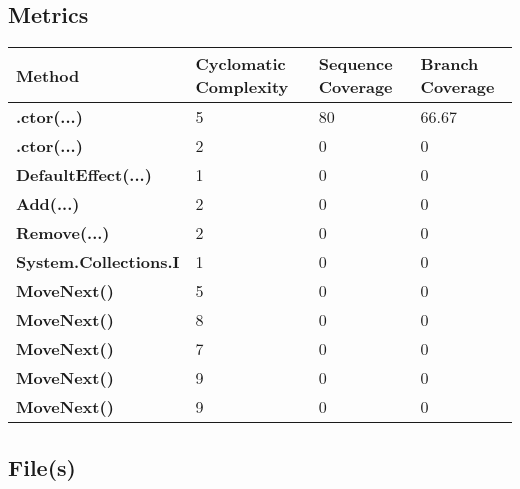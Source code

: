 \documentclass[a4paper,10pt]{article}
\begin{document}
\subsection{Metrics}
\begin{longtable}[l]{|l|l|l|l|}
\hline
\textbf{Method} & \textbf{Cyclomatic Complexity} & \textbf{Sequence Coverage} & \textbf{Branch Coverage}\\
\hline
\textbf{.ctor(...)} & 5 & 80 & 66.67\\
\hline
\textbf{.ctor(...)} & 2 & 0 & 0\\
\hline
\textbf{DefaultEffect(...)} & 1 & 0 & 0\\
\hline
\textbf{Add(...)} & 2 & 0 & 0\\
\hline
\textbf{Remove(...)} & 2 & 0 & 0\\
\hline
\textbf{System.Collections.I} & 1 & 0 & 0\\
\hline
\textbf{MoveNext()} & 5 & 0 & 0\\
\hline
\textbf{MoveNext()} & 8 & 0 & 0\\
\hline
\textbf{MoveNext()} & 7 & 0 & 0\\
\hline
\textbf{MoveNext()} & 9 & 0 & 0\\
\hline
\textbf{MoveNext()} & 9 & 0 & 0\\
\hline
\end{longtable}
\subsection{File(s)}
\end{document}
